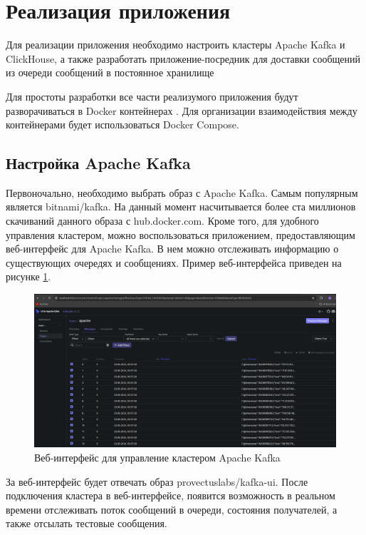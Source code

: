 \documentclass[14pt, russian]{scrartcl}
\begin{document}
\section{Реализация приложения}

Для реализации приложения
необходимо настроить
кластеры Apache Kafka
и ClickHouse, а также
разработать приложение-посредник
для доставки сообщений из очереди
сообщений в постоянное хранилище


Для простоты разработки все части
реализумого приложения будут разворачиваться
в Docker контейнерах \cite{DockerBook}. Для организации
взаимодействия между контейнерами будет
использоваться Docker Compose.

\subsection{Настройка Apache Kafka}

Первоночально, необходимо выбрать образ с Apache Kafka.
Самым популярным является bitnami/kafka. На данный
момент насчитывается более ста миллионов скачиваний данного образа
с hub.docker.com. Кроме того, для удобного
управления кластером, можно воспользоваться
приложением, предоставляющим веб-интерфейс для
Apache Kafka. В нем можно отслеживать информацию о существующих очередях
и сообщениях. Пример веб-интерфейса приведен на рисунке \ref{fig:kafkaui}.

\begin{figure}[H]
	\centering
	\begin{minipage}[t]{.9\textwidth}
		\centering
		\includegraphics[width=.7\textwidth]{./imgs/kafkaui.png}
	\end{minipage}
	\caption{Веб-интерфейс для управление кластером Apache Kafka}
	\label{fig:kafkaui}
\end{figure}

За веб-интерфейс будет отвечать образ provectuslabs/kafka-ui.
После подключения кластера в веб-интерфейсе, появится возможность
в реальном времени отслеживать поток сообщений в очереди,
состояния получателей, а также отсылать тестовые сообщения.
\end{document}
